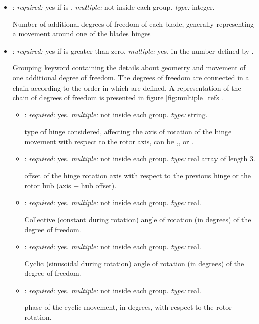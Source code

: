 \begin{itemize}
    \item {}: \textit{required:} yes if  is . \textit{multiple:} not inside each  group. \textit{type:} integer.
    
    Number of additional degrees of freedom of each blade, generally representing a movement around one of the blades hinges
    
    \item {}: \textit{required:} yes if  is greater than zero. \textit{multiple:} yes, in the number defined by . 
    
    Grouping keyword containing the details about geometry and movement of one additional degree of freedom. The degrees of freedom are connected in a chain according to the order in which are defined. A representation of the chain of degrees of freedom is presented in figure \ref{fig:multiple_refs}.
    
    \begin{itemize}
    \item {}: \textit{required:} yes. \textit{multiple:} not inside each  group. \textit{type:} string.
    
    type of hinge considered, affecting the axis of rotation of the hinge movement with respect to the rotor axis, can be ,, or .
    
    \item {}: \textit{required:} yes. \textit{multiple:} not inside each  group. \textit{type:} real array of length 3.
    
    offset of the hinge rotation axis with respect to the previous hinge or the rotor hub (axis + hub offset).
    
    \item {}: \textit{required:} yes. \textit{multiple:} not inside each  group. \textit{type:} real.
    
    Collective (constant during rotation) angle of rotation (in degrees) of the degree of freedom.
    
    \item {}: \textit{required:} yes. \textit{multiple:} not inside each  group. \textit{type:} real.
    
    Cyclic (sinusoidal during rotation) angle of rotation (in degrees) of the degree of freedom.
    
        \item {}: \textit{required:} yes. \textit{multiple:} not inside each  group. \textit{type:} real.
    
    phase of the cyclic movement, in degrees, with respect to the rotor rotation. 
    
    \end{itemize}
\end{itemize}

